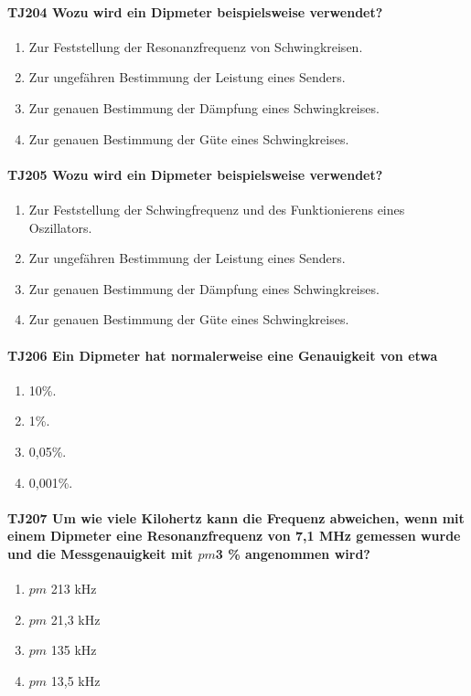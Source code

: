 \documentclass[8pt]{article}
\begin{document}
\paragraph*{TJ204 Wozu wird ein Dipmeter beispielsweise verwendet?}
\begin{enumerate}[nolistsep,label=\Alph*]
\item Zur Feststellung der Resonanzfrequenz von Schwingkreisen.
\item Zur ungefähren Bestimmung der Leistung eines Senders.
\item Zur genauen Bestimmung der Dämpfung eines Schwingkreises.
\item Zur genauen Bestimmung der Güte eines Schwingkreises.
\end{enumerate}

\paragraph*{TJ205 Wozu wird ein Dipmeter beispielsweise verwendet?}
\begin{enumerate}[nolistsep,label=\Alph*]
\item Zur Feststellung der Schwingfrequenz und des Funktionierens eines Oszillators.
\item Zur ungefähren Bestimmung der Leistung eines Senders.
\item Zur genauen Bestimmung der Dämpfung eines Schwingkreises.
\item Zur genauen Bestimmung der Güte eines Schwingkreises.
\end{enumerate}

\paragraph*{TJ206 Ein Dipmeter hat normalerweise eine Genauigkeit von etwa}
\begin{enumerate}[nolistsep,label=\Alph*]
\item 10\%.
\item 1\%.
\item 0,05\%.
\item 0,001\%.
\end{enumerate}

\paragraph*{TJ207 Um wie viele Kilohertz kann die Frequenz abweichen, wenn mit einem Dipmeter eine Resonanzfrequenz von 7,1 MHz gemessen wurde und die Messgenauigkeit mit $pm$3 \% angenommen wird?}
\begin{enumerate}[nolistsep,label=\Alph*]
\item $pm$ 213 kHz
\item $pm$ 21,3 kHz
\item $pm$ 135 kHz
\item $pm$ 13,5 kHz
\end{enumerate}
\end{document}
